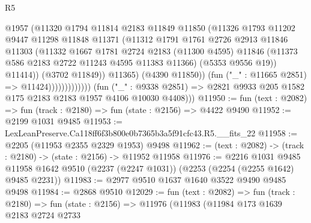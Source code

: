 \begin{lexlean}{R5}
\begin{coremodule}
                                    @1957
                                    (@11320
                                      @1794
                                      @11814
                                      @2183
                                      @11849
                                      @11850
                                      (@11326
                                        @1793
                                        @11202
                                        @9447
                                        @11298
                                        @11848
                                        @11371
                                        (@11312
                                          @1791
                                          @1761
                                          @2726
                                          @2913
                                          @11846
                                          @11303
                                          (@11332
                                            @1667
                                            @1781
                                            @2724
                                            @2183
                                            (@11300 @4595)
                                            @11846
                                            (@11373 @586 @2183 @2722 @11243 @4595 @11383 @11366)
                                            (@5353 @9556 @19))
                                          @11414))
                                      (@3702 @11849))
                                    @11365)
                                  (@4390 @11850))
                                (fun ("_" : @11665 @2851) => @11424)))))))))))))
        (fun ("_" : @9338 @2851) =>
        @2821 @9933 @205 @1582 @175 @2183 @2183 @1957 @4106 @10030 @4408)))
@11950 := fun (text : @2082) => fun (track : @2180) => fun (state : @2156) => @4422 @9490
@11952 := @2199 @1031 @9485
@11953 := LexLeanPreserve.Ca118ff6f3b800e0b7365b3a5f91cfc43.R5.__fits_22
@11958 := @2205 (@11953 @2355 @2329 @1953) @9498
@11962 := (text : @2082) -> (track : @2180) -> (state : @2156) -> @11952 @11958
@11976 := @2216
    @1031
    @9485
    @11958
    @1642
    @9510
    (@2237 (@2247 @1031))
    (@2253 (@2254 (@2255 @1642) @9485 @2231))
@11983 := @2977 @9510 @1637 @1640 @3522 @9490 @9485 @9498
@11984 := @2868 @9510
@12029 := fun (text : @2082) =>
  fun (track : @2180) =>
  fun (state : @2156) =>
  @11976
    (@11983
      (@11984
        @173
        @1639
        @2183
        @2724
        @2733

\end{coremodule}
\end{lexlean}
